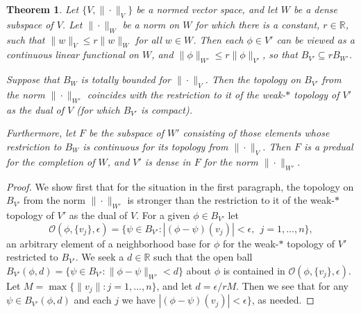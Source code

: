 \documentclass{amsart}[14pt]
\newtheorem{theorem}{Theorem}[section]
\theoremstyle{definition}
\theoremstyle{remark}
\newcommand{\cO}{{\mathcal O}}
\newcommand{\bR}{{\mathbb R}}
\newcommand{\<}{\langle}
\renewcommand{\>}{\rangle}
\numberwithin{equation}{section}
\begin{document}
{\begin{theorem}
\label{predual}
Let $\{V, \|\cdot\|_V\}$ be a normed vector space, and let $W$ be a dense 
subspace of $V$. Let $\| \cdot \|_W$ be a norm on $W $ for which there is a 
constant, $r \in \bR$, such that $\|w\|_V \leq r \|w\|_W$ for all $w \in W$.
Then each $\phi \in V'$ can be viewed as a continuous linear functional on $W$,
and $\|\phi\|_{W'} \leq r \|\phi\|_{V'}$, so that $B_{V'} \subseteq r B_{W'}$. 

Suppose that $B_W$ is totally bounded for $\|\cdot\|_V$. Then
the topology on $B_{V'}$ from the norm $\|\cdot\|_{W'}$ coincides
with the restriction to it of the weak-$*$ topology of $V'$ as the
dual of $V$ (for which $B_{V'}$ is compact). 

Furthermore, let $F$ be the subspace of $W'$ consisting
of those elements whose restriction to $B_W$ is continuous for
its topology from $\|\cdot \|_V$. Then $F$ is a predual for 
the completion of $W$, 
and $V'$ is  dense in $F$ for the norm $\|\cdot\|_{W'}$.
 \end{theorem}
 
\begin{proof}
We show first that for the situation in the first paragraph, the
 topology on $B_{V'}$ from the norm $\|\cdot\|_{W'}$ is stronger than
 the restriction to it of the weak-$*$ topology of $V'$ as the
dual of $V$. For a given $\phi \in  B_{V'}$ let 
\[
\cO(\phi, \{v_j\}, \epsilon) =\{\psi \in  B_{V'}: |(\phi - \psi)(v_j)| < \epsilon, \ \ 
 j = 1, \dots , n\}  ,
\]
 an arbitrary element of a neighborhood base for $\phi$ for the weak-$*$ topology of $V'$
 restricted to $B_{V'}$.
 We seek a $d \in \bR$ such that the open 
 ball $B_{V'}(\phi, d) = \{\psi \in  B_{V'}: \|\phi - \psi\|_{W'} < d\}$ about $\phi$ is contained in
$\cO(\phi, \{v_j\}, \epsilon) $. Let $M = \max\{\|v_j\|: j = 1,\dots , n\}$, and let
$d = \epsilon/rM$. Then we see that for any $\psi \in B_{V'}(\phi, d)$ and each $j$ we 
have $|(\phi - \psi)(v_j)| < \epsilon\}$, as needed.   


\end{proof}}
\end{document}
